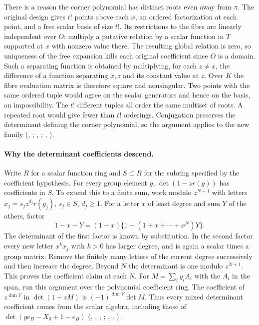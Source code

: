 There is a reason the corner polynomial has distinct roots even away
from $\pi$. The original design gives $t!$ points above each $x$, an
ordered factorization at each point, and a free scalar basis of size
$t!$. Its restrictions to the fibre are linearly independent over $O$:
multiply a putative relation by a scalar function in $T$ supported at
$x$ with nonzero value there. The resulting global relation is zero,
so uniqueness of the free expansion kills each original coefficient
since $O$ is a domain. Such a separating function is obtained by
multiplying, for each $z\ne x$, the difference of a function separating
$x,z$ and its constant value at $z$. Over $K$ the fibre evaluation
matrix is therefore square and nonsingular. Two points with the same
ordered tuple would agree on the scalar generators and hence on the
basis, an impossibility. The $t!$ different tuples all order the
same multiset of roots. A repeated root would give fewer than $t!$
orderings. Conjugation preserves the determinant defining the corner
polynomial, so the argument applies to the new family
(, ;
, ;
, ).

\paragraph{Why the determinant coefficients descend.}
Write $R$ for a scalar function ring and $S\subset R$ for the subring
specified by the coefficient hypothesis. For every group element $g$,
$\det(1-zr(g))$ has coefficients in $S$. To extend this to a finite
sum, work modulo $z^{N+1}$ with letters $x_j=s_jz^{d_j}r(g_j)$,
$s_j\in S$, $d_j\ge1$. For a letter $x$ of least degree and sum $Y$
of the others, factor
\[
  1-x-Y=(1-x)\{1-(1+x+\cdots+x^N)Y\}.
\]
The determinant of the first factor is known by substitution. In the
second factor every new letter $x^k x_j$ with $k>0$ has larger degree,
and is again a scalar times a group matrix. Remove the finitely many
letters of the current degree successively and then increase the degree.
Beyond $N$ the determinant is one modulo $z^{N+1}$. This proves the
coefficient claim at each $N$. For $M=\sum_i y_i A_i$ with the $A_i$
in the span, run this argument over the polynomial coefficient ring.
The coefficient of $z^{\dim V}$ in $\det(1-zM)$ is
$(-1)^{\dim V}\det M$. Thus every mixed determinant coefficient comes
from the scalar algebra, including those of
$\det(ye_B-X_0+1-e_B)$
(, , ,
;
, , ).

